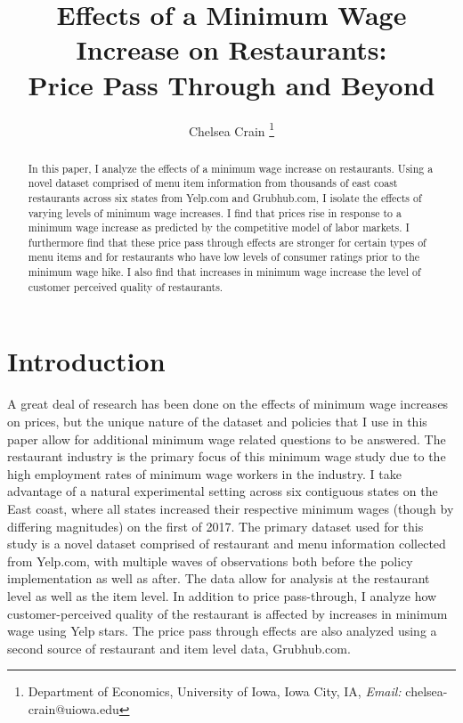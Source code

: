 \documentclass[11pt]{article}
\title{ Effects of a Minimum Wage Increase on Restaurants: \\ Price Pass Through and Beyond}
\author{Chelsea Crain \footnote{Department of Economics, University of Iowa, Iowa City, IA, \textit{Email: }chelsea-crain@uiowa.edu} }
\begin{document}
\maketitle

\begin{abstract}
In this paper, I analyze the effects of a minimum wage increase on restaurants. Using a novel dataset comprised of menu item information from thousands of east coast restaurants across six states from Yelp.com and Grubhub.com, I isolate the effects of varying levels of minimum wage increases. I find that prices rise in response to a minimum wage increase as predicted by the competitive model of labor markets. I furthermore find that these price pass through effects are stronger for certain types of menu items and for restaurants who have low levels of consumer ratings prior to the minimum wage hike. I also find that increases in minimum wage increase the level of customer perceived quality of restaurants.

\end{abstract}



\section{Introduction}
A great deal of research has been done on the effects of minimum wage increases on prices, but the unique nature of the dataset and policies that I use in this paper allow for additional minimum wage related questions to be answered. The restaurant industry is the primary focus of this minimum wage study due to the high employment rates of minimum wage workers in the industry. I take advantage of a natural experimental setting across six contiguous states on the East coast, where all states increased their respective minimum wages (though by differing magnitudes) on the first of 2017. The primary dataset used for this study is a novel dataset comprised of restaurant and menu information collected from Yelp.com, with multiple waves of observations both before the policy implementation as well as after. The data allow for analysis at the restaurant level as well as the item level. In addition to price pass-through, I analyze how customer-perceived quality of the restaurant is affected by increases in minimum wage using Yelp stars. The price pass through effects are also analyzed using a second source of restaurant and item level data, Grubhub.com.
\end{document}

